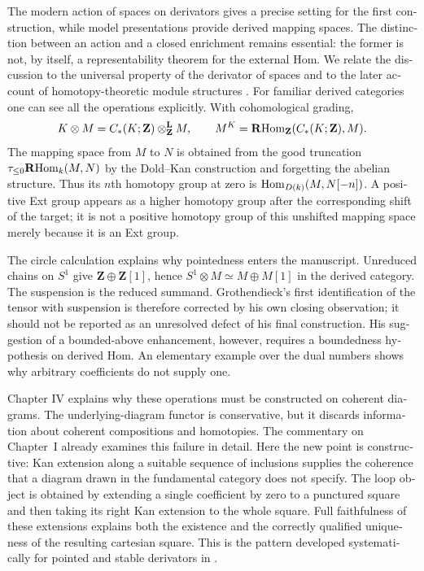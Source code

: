 \begin{otherlanguage}{english}
The modern action of spaces on derivators gives a precise setting for the
first construction, while model presentations provide derived mapping spaces.
The distinction between an action and a closed enrichment remains essential:
the former is not, by itself, a representability theorem for the external
Hom. We relate the discussion to the universal property of the derivator of
spaces and to the later account of homotopy-theoretic module structures
\citep{Cisinski2008,GrothShulman2017}. For familiar derived categories one can
see all the operations explicitly. With cohomological grading,
\[
 K\otimes M=C_*(K;\mathbf Z)\otimes^{\mathbf L}_{\mathbf Z}M,
 \qquad
 M^K=\mathbf R\mathrm{Hom}_{\mathbf Z}(C_*(K;\mathbf Z),M).
\]
The mapping space from $M$ to $N$ is obtained from the good truncation
$\tau_{\leq0}\mathbf R\mathrm{Hom}_k(M,N)$ by the Dold--Kan construction and
forgetting the abelian structure. Thus its $n$th homotopy group at zero is
$\mathrm{Hom}_{D(k)}(M,N[-n])$. A positive Ext group appears as a higher homotopy
group after the corresponding shift of the target; it is not a positive
homotopy group of this unshifted mapping space merely because it is an Ext
group.

The circle calculation explains why pointedness enters the manuscript.
Unreduced chains on $S^1$ give $\mathbf Z\oplus\mathbf Z[1]$, hence
$S^1\otimes M\simeq M\oplus M[1]$ in the derived category. The suspension
is the reduced summand. Grothendieck's first identification of the tensor
with suspension is therefore corrected by his own closing observation; it
should not be reported as an unresolved defect of his final construction.
His suggestion of a bounded-above enhancement, however, requires a boundedness
hypothesis on derived Hom. An elementary example over the dual numbers shows
why arbitrary coefficients do not supply one.

Chapter IV explains why these operations must be constructed on coherent
diagrams. The underlying-diagram functor is conservative, but it discards
information about coherent compositions and homotopies. The commentary on Chapter~I
already examines this failure in detail. Here the new point is constructive:
Kan extension along a suitable sequence of inclusions supplies the coherence
that a diagram drawn in the fundamental category does not specify.
The loop object is obtained by extending a single coefficient by zero to
a punctured square and then taking its right Kan extension to the whole
square. Full faithfulness of these extensions explains both the existence
and the correctly qualified uniqueness of the resulting cartesian square.
This is the pattern developed systematically for pointed and stable
derivators in \citet{Groth2013}.


\end{otherlanguage}
